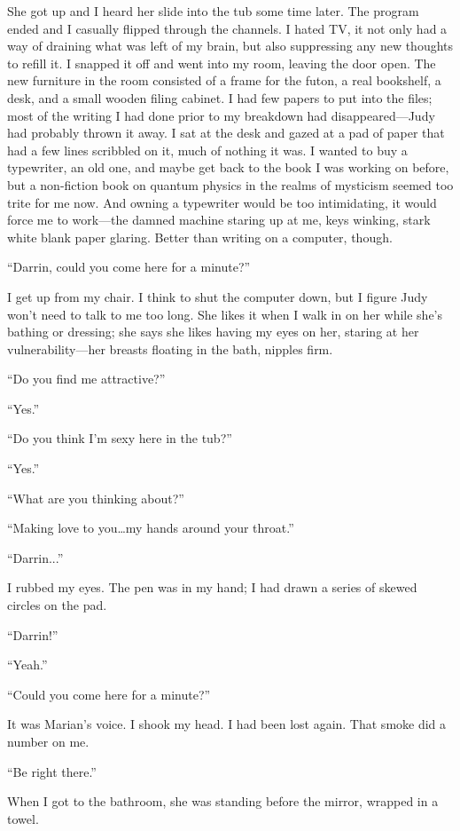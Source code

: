 \documentclass[
]{article}
\begin{document}
She got up and I heard her slide into the tub some time later. The
program ended and I casually flipped through the channels. I hated TV,
it not only had a way of draining what was left of my brain, but also
suppressing any new thoughts to refill it. I snapped it off and went
into my room, leaving the door open. The new furniture in the room
consisted of a frame for the futon, a real bookshelf, a desk, and a
small wooden filing cabinet. I had few papers to put into the files;
most of the writing I had done prior to my breakdown had
disappeared---Judy had probably thrown it away. I sat at the desk and
gazed at a pad of paper that had a few lines scribbled on it, much of
nothing it was. I wanted to buy a typewriter, an old one, and maybe get
back to the book I was working on before, but a non-fiction book on
quantum physics in the realms of mysticism seemed too trite for me now.
And owning a typewriter would be too intimidating, it would force me to
work---the damned machine staring up at me, keys winking, stark white
blank paper glaring. Better than writing on a computer, though.

``Darrin, could you come here for a minute?''

I get up from my chair. I think to shut the computer down, but I figure
Judy won't need to talk to me too long. She likes it when I walk in on
her while she's bathing or dressing; she says she likes having my eyes
on her, staring at her vulnerability---her breasts floating in the bath,
nipples firm.

``Do you find me attractive?''

``Yes.''

``Do you think I'm sexy here in the tub?''

``Yes.''

``What are you thinking about?''

``Making love to you\ldots my hands around your throat.''

``Darrin...''

I rubbed my eyes. The pen was in my hand; I had drawn a series of skewed
circles on the pad.

``Darrin!''

``Yeah.''

``Could you come here for a minute?''

It was Marian's voice. I shook my head. I had been lost again. That
smoke did a number on me.

``Be right there.''

When I got to the bathroom, she was standing before the mirror, wrapped
in a towel.
\end{document}
